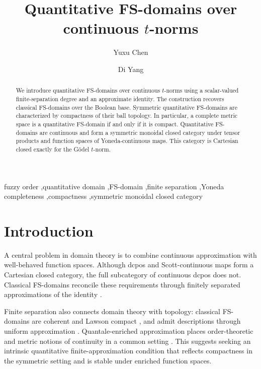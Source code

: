 \documentclass[preprint,3p,times]{elsarticle}
\theoremstyle{definition}
\theoremstyle{remark}
\numberwithin{equation}{section}
\begin{document}
\begin{frontmatter}
\title{Quantitative FS-domains over continuous \texorpdfstring{\(t\)}{t}-norms}

\author[addr1]{Yuxu Chen}
\author[addr1]{Di Yang\texorpdfstring{}{*}}
\address[addr1]{School of Mathematics, Sichuan University, Chengdu 610064, China}



\begin{abstract}
We introduce quantitative FS-domains over continuous \(t\)-norms using a scalar-valued finite-separation degree and an approximate identity. The construction recovers classical FS-domains over the Boolean base. Symmetric quantitative FS-domains are characterized by compactness of their ball topology. In particular,  a complete metric space is a quantitative FS-domain if and only if it is compact. 
Quantitative FS-domains are continuous and form a symmetric monoidal closed category under tensor products and function spaces of Yoneda-continuous maps. This category is Cartesian closed exactly for the Gödel \(t\)-norm.
\end{abstract}
\begin{keyword}
fuzzy order \sep quantitative domain \sep FS-domain \sep finite separation \sep Yoneda completeness \sep compactness \sep symmetric monoidal closed category
\end{keyword}
\end{frontmatter}


\section{Introduction}\label{sec:introduction}

A central problem in domain theory is to combine continuous approximation with well-behaved function spaces. Although dcpos and Scott-continuous maps form a Cartesian closed category, the full subcategory of continuous dcpos does not. Classical FS-domains reconcile these requirements through finitely separated approximations of the identity \cite{AbramskyJung1994,Jung1990}.

Finite separation also connects domain theory with topology: classical FS-domains are coherent and Lawson compact \cite[Theorem~4.2.18 and Proposition~4.2.20]{AbramskyJung1994}, and admit descriptions through uniform approximation \cite{JungSunderhauf1998,Kummetz1999}. Quantale-enriched approximation places order-theoretic and metric notions of continuity in a common setting \cite{HofmannWaszkiewicz2011}. This suggests seeking an intrinsic quantitative finite-approximation condition that reflects compactness in the symmetric setting and is stable under enriched function spaces.
\end{document}
